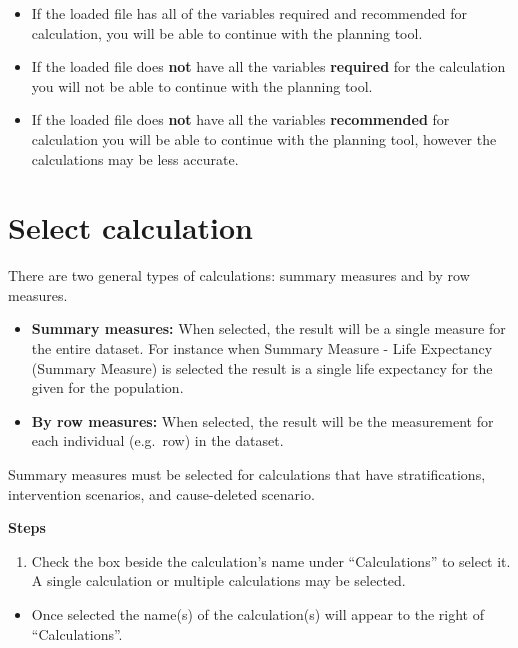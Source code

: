 \documentclass[]{book}
\providecommand{\tightlist}{%
  \setlength{\itemsep}{0pt}\setlength{\parskip}{0pt}}
\begin{document}
\begin{itemize}
\item
  If the loaded file has all of the variables required and recommended
  for calculation, you will be able to continue with the planning tool.
\item
  If the loaded file does \textbf{not} have all the variables
  \textbf{required} for the calculation you will not be able to continue
  with the planning tool.
\item
  If the loaded file does \textbf{not} have all the variables
  \textbf{recommended} for calculation you will be able to continue with
  the planning tool, however the calculations may be less accurate.
\end{itemize}

\section{Select calculation}\label{select-calculation}

There are two general types of calculations: summary measures and by row
measures.

\begin{itemize}
\item
  \textbf{Summary measures:} When selected, the result will be a single measure for
the entire dataset. For instance when Summary Measure - Life Expectancy
(Summary Measure) is selected the result is a single life expectancy for
the given for the population.
\item
  \textbf{By row measures:} When selected, the result will be the measurement for
each individual (e.g.~row) in the dataset.
\end{itemize}

Summary measures must be selected for calculations that have
stratifications, intervention scenarios, and cause-deleted scenario.

\textbf{Steps}

\begin{enumerate}
\def\labelenumi{\arabic{enumi}.}
\tightlist
\item
  Check the box beside the calculation's name under ``Calculations'' to
  select it. A single calculation or multiple calculations may be
  selected.
\end{enumerate}

\begin{itemize}
\tightlist
\item
  Once selected the name(s) of the calculation(s) will appear to the
  right of ``Calculations''.
\end{itemize}
\end{document}
